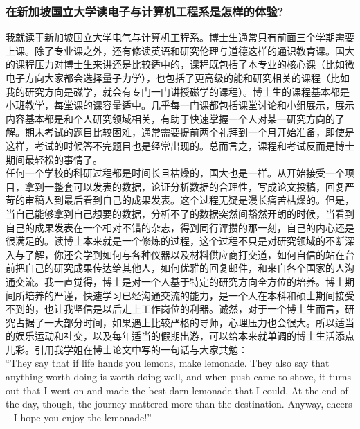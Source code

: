 \documentclass[a4paper,UTF8]{book}
\begin{document}
    \subsubsection*{在新加坡国立大学读电子与计算机工程系是怎样的体验?}
    我就读于新加坡国立大学电气与计算机工程系。博士生通常只有前面三个学期需要上课。除了专业课之外，还有修读英语和研究伦理与道德这样的通识教育课。国大的课程压力对博士生来讲还是比较适中的，课程既包括了本专业的核心课（比如微电子方向大家都会选择量子力学），也包括了更高级的能和研究相关的课程（比如我的研究方向是磁学，就会有专门一门讲授磁学的课程）。博士生的课程基本都是小班教学，每堂课的课容量适中。几乎每一门课都包括课堂讨论和小组展示，展示内容基本都是和个人研究领域相关，有助于快速掌握一个人对某一研究方向的了解。期末考试的题目比较困难，通常需要提前两个礼拜到一个月开始准备，即使是这样，考试的时候答不完题目也是经常出现的。总而言之，课程和考试反而是博士期间最轻松的事情了。\\
    任何一个学校的科研过程都是时间长且枯燥的，国大也是一样。从开始接受一个项目，拿到一整套可以发表的数据，论证分析数据的合理性，写成论文投稿，回复严苛的审稿人到最后看到自己的成果发表。这个过程无疑是漫长痛苦枯燥的。但是，当自己能够拿到自己想要的数据，分析不了的数据突然间豁然开朗的时候，当看到自己的成果发表在一个相对不错的杂志，得到同行评攒的那一刻，自己的内心还是很满足的。读博士本来就是一个修炼的过程，这个过程不只是对研究领域的不断深入与了解，你还会学到如何与各种仪器以及材料供应商打交道，如何自信的站在台前把自己的研究成果传达给其他人，如何优雅的回复邮件，和来自各个国家的人沟通交流。我一直觉得，博士是对一个人基于特定的研究方向全方位的培养。博士期间所培养的严谨，快速学习已经沟通交流的能力，是一个人在本科和硕士期间接受不到的，也让我坚信是以后走上工作岗位的利器。诚然，对于一个博士生而言，研究占据了一大部分时间，如果遇上比较严格的导师，心理压力也会很大。所以适当的娱乐运动和社交，以及每年适当的假期出游，可以给本来就单调的博士生活添点儿彩。引用我学姐在博士论文中写的一句话与大家共勉：\\“They say that if life hands you lemons, make lemonade. They also say that anything worth doing is worth doing well, and when push came to shove, it turns out that I went on and made the best darn lemonade that I could. At the end of the day, though, the journey mattered more than the destination. Anyway, cheers – I hope you enjoy the lemonade!” 
\end{document}
